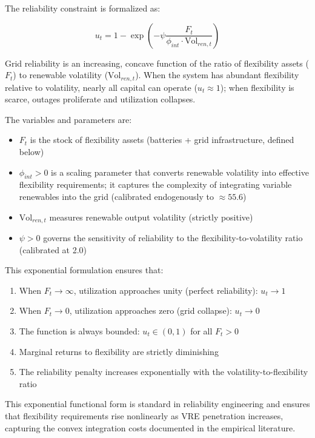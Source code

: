 \documentclass[12pt, a4paper]{article}
\begin{document}
The reliability constraint is formalized as:

\begin{equation}
u_t = 1 - \exp\left(-\psi \frac{F_t}{\phi_{int} \cdot \text{Vol}_{ren,t}}\right)
\label{eq:utilization}
\end{equation}

Grid reliability is an increasing, concave function of the ratio of flexibility assets ($F_t$) to renewable volatility ($\text{Vol}_{ren,t}$). When the system has abundant flexibility relative to volatility, nearly all capital can operate ($u_t \approx 1$); when flexibility is scarce, outages proliferate and utilization collapses.

The variables and parameters are:
\begin{itemize}
    \item $F_t$ is the stock of flexibility assets (batteries + grid infrastructure, defined below)
    \item $\phi_{int} > 0$ is a scaling parameter that converts renewable volatility into effective flexibility requirements; it captures the complexity of integrating variable renewables into the grid (calibrated endogenously to $\approx 55.6$)
    \item $\text{Vol}_{ren,t}$ measures renewable output volatility (strictly positive)
    \item $\psi > 0$ governs the sensitivity of reliability to the flexibility-to-volatility ratio (calibrated at 2.0)
\end{itemize}

This exponential formulation ensures that:
\begin{enumerate}
    \item When $F_t \to \infty$, utilization approaches unity (perfect reliability): $u_t \to 1$
    \item When $F_t \to 0$, utilization approaches zero (grid collapse): $u_t \to 0$
    \item The function is always bounded: $u_t \in (0, 1)$ for all $F_t > 0$
    \item Marginal returns to flexibility are strictly diminishing
    \item The reliability penalty increases exponentially with the volatility-to-flexibility ratio
\end{enumerate}

This exponential functional form is standard in reliability engineering \citep{zakeri2015, lund2015} and ensures that flexibility requirements rise nonlinearly as VRE penetration increases, capturing the convex integration costs documented in the empirical literature.
\end{document}

